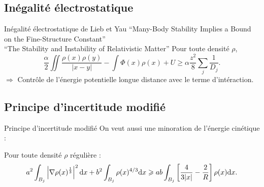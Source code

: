 \documentclass{beamer}
\newcommand{\dd}{\mathrm d}
\renewcommand{\geq}{\geqslant}
\begin{document}
\subsection{Inégalité électrostatique}
\begin{frame}{Inégalité électrostatique de Lieb et Yau}
    {``Many-Body Stability Implies a Bound on the Fine-Structure Constant''\\
    ``The Stability and Instability of Relativistic Matter''}
    Pour toute densité $\rho$,
    \[\frac{\alpha}{2}\iint
    \frac{\rho(x)\rho(y)}{|x-y|}-\int\Phi(x)\rho(x) + U \geq
    \alpha \frac{z^2}{8}\sum_j \frac{1}{D_j}.\]
    $\Rightarrow$ Contrôle de l'énergie potentielle longue distance avec le terme d'intéraction.
\end{frame}
\subsection{Principe d'incertitude modifié}
\begin{frame}{Principe d'incertitude modifié}
    On veut aussi une minoration de l'énergie cinétique :

    \vspace{1cm}

    Pour toute densité $\rho$ régulière :
    \[a^2\int_{B_j}\left|\nabla \rho(x)^{\tiny{\frac{1}{3}}}\right|^2 \dd x + b^2 \int_{B_j} \rho(x)^{4/3}\dd x \geq ab \int_{B_j}
    \left[\frac{4}{3|x|}-\frac{2}{R}\right]\rho(x)\dd x.\]

\end{frame}
\end{document}
